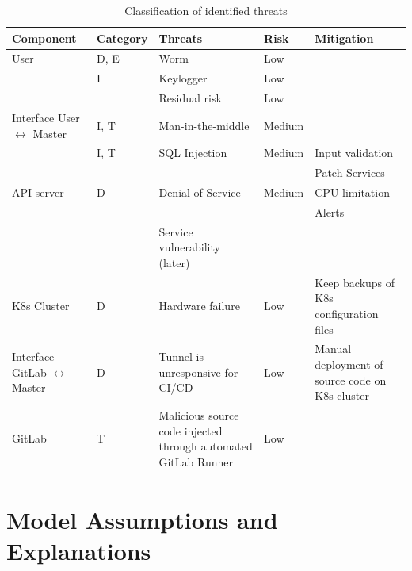 \begin{table}[h]
    \centering
    \caption{\label{tab:threats-classification}Classification of identified threats}
    \begin{tabular*}{\textwidth}{p{2.1cm} p{1.8cm} p{3cm} p{2cm} p{3.5cm}}
        \textbf{Component} & \textbf{Category} & \textbf{Threats} & \textbf{Risk} & \textbf{Mitigation} \\
        \hline
        User                & D, E & Worm & Low & \\
                            & I & Keylogger & Low & \\
                            & & Residual risk & Low & \\
        \hline
        Interface User \(\leftrightarrow\) Master   & I, T & Man-in-the-middle & Medium & \\
                                & I, T & SQL Injection & Medium & Input validation \\
                                & & & & Patch Services \\
        \hline
        API server          & D & Denial of Service & Medium & CPU limitation \\
                            & & & & Alerts \\
                            & & Service vulnerability (later) & & \\
        \hline
        K8s Cluster             & D & Hardware failure & Low & Keep backups of K8s configuration files \\
        \hline
        Interface GitLab \(\leftrightarrow\) Master & D & Tunnel is unresponsive for CI/CD & Low & Manual deployment of source code on K8s cluster \\
        \hline
        GitLab             & T & Malicious source code injected through automated GitLab Runner & Low & \\ 
        \hline
    \end{tabular*}
\end{table}


\section{Model Assumptions and Explanations}

